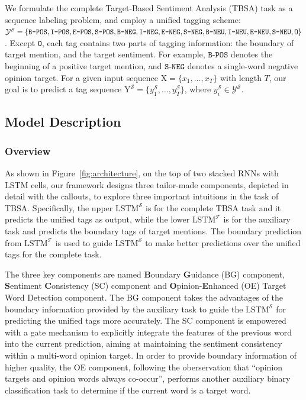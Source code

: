 \documentclass[letterpaper]{article} %
\begin{document}
We formulate the complete Target-Based Sentiment Analysis (TBSA) task as a sequence labeling problem, and employ a unified tagging scheme: $\mathcal{Y}^{\mathcal{S}} = \{\texttt{B-POS},\texttt{I-POS},\texttt{E-POS}, \texttt{S-POS}, \texttt{B-NEG},\texttt{I-NEG},\texttt{E-NEG},\\ \texttt{S-NEG}, \texttt{B-NEU},\texttt{I-NEU},\texttt{E-NEU}, \texttt{S-NEU}, \texttt{O}\}$.
Except \texttt{O}, each tag contains two parts of tagging information: the boundary of target mention, and the target sentiment. For example, $\texttt{B-POS}$ denotes the beginning of a positive target mention, and $\texttt{S-NEG}$ denotes a single-word negative opinion target.
For a given input sequence $\mathrm{ X}=\{x_1,\dots,x_T\}$ with length $T$, our goal is to predict a tag sequence $\mathrm{ Y}^{\mathcal{S}}=\{y^{\mathcal{S}}_1,\dots,y^{\mathcal{S}}_T\}$, where $y^{\mathcal{S}}_i \in \mathcal{Y}^{\mathcal{S}}$.


\subsection{Model Description}
\subsubsection{Overview}
As shown in Figure~\ref{fig:architecture}, on the top of two stacked RNNs with LSTM cells, our framework designs three tailor-made components, depicted in detail with the callouts, to explore three important intuitions in the task of TBSA.
Specifically, the upper $\text{LSTM}^{\mathcal{S}}$ is for the complete TBSA task and it predicts the unified tags as output, while the lower $\text{LSTM}^{\mathcal{T}}$ is for the auxiliary task and predicts the boundary tags of target mentions. The boundary prediction from $\text{LSTM}^{\mathcal{T}}$ is used to guide $\text{LSTM}^{\mathcal{S}}$ to make better predictions over the unified tags for the complete task.


The three key components are named \textbf{B}oundary \textbf{G}uidance (BG) component, \textbf{S}entiment \textbf{C}onsistency (SC) component and \textbf{O}pinion-\textbf{E}nhanced (OE) Target Word Detection component. The BG component takes the advantages of the boundary information provided by the auxiliary task to guide the $\text{LSTM}^{\mathcal{S}}$ for predicting the unified tags more accurately. The SC component is empowered with a gate mechanism to explicitly integrate the features of the previous word into the current prediction, aiming at maintaining the sentiment consistency within a multi-word opinion target. In order to provide boundary information of higher quality, the OE component, following the oberservation that ``opinion targets and opinion words always co-occur'', performs another auxiliary binary classification task to determine if the current word is a target word.
\end{document}
